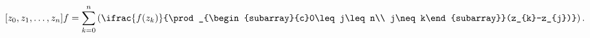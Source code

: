 \[[z_{0},z_{1},\dots,z_{n}]f=\sum_{k=0}^{n}\left(\ifrac{f(z_{k})}{\prod_{%
\begin{subarray}{c}0\leq j\leq n\\
j\neq k\end{subarray}}(z_{k}-z_{j})}\right).\]